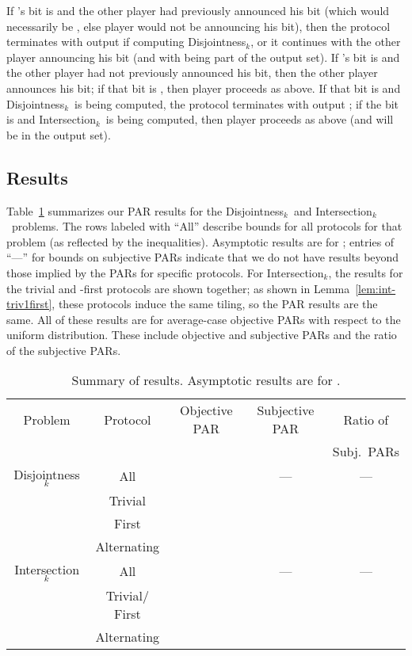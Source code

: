 \documentclass{article}
\theoremstyle{theorem}
\theoremstyle{definition}
\theoremstyle{remark}
\newcommand{\disjoint}{{\sc Dis\-joint\-ness}\ensuremath{_k}}
\newcommand{\intersection}{{\sc In\-ter\-sec\-tion}\ensuremath{_k}}
\begin{document}
If 's  bit is  and the other player had previously announced his  bit (which would necessarily be , else player  would not be announcing his  bit), then the protocol terminates with output  if computing \disjoint, or it continues with the other player announcing his  bit (and with  being part of the output set).  If 's  bit is  and the other player had not previously announced his  bit, then the other player announces his  bit; if that bit is , then player  proceeds as above.  If that bit is  and \disjoint\ is being computed, the protocol terminates with output ; if the bit is  and \intersection\ is being computed, then player  proceeds as above (and  will be in the output set).

\subsection{Results}

Table~\ref{tab:results} summarizes our PAR results for the \disjoint\ and \intersection\ problems.  The rows labeled with ``All'' describe bounds for all protocols for that problem (as reflected by the inequalities).  Asymptotic results are for ; entries of ``---'' for bounds on subjective PARs indicate that we do not have results beyond those implied by the PARs for specific protocols.
For \intersection, the results for the trivial and -first protocols are shown together; as shown in Lemma~\ref{lem:int-triv1first}, these protocols induce the same tiling, so the PAR results are the same.  All of these results are for average-case objective PARs with respect to the uniform distribution.  These include objective and subjective PARs and the ratio of the subjective PARs.



\begin{table}[htp]
\begin{center}
\small
\begin{tabular}{|c|c|c|c|c|}
  \hline
  Problem & Protocol & Objective PAR & Subjective PAR & Ratio of \\
          &          &               &                & Subj.\ PARs \\ \hline\hline
  \disjoint & All &  & --- & --- \\ \hline
    & Trivial &  &  &  \\ \hline
    &  First &  &  &  \\ \hline
    & Alternating &  &  &  \\ \hline \hline
  \intersection & All &  & --- & --- \\ \hline
    & Trivial/ First &    &  &  \\ \hline
    & Alternating &  &  &  \\ \hline
\end{tabular}
\end{center}
\caption{Summary of results.  Asymptotic results are for .}\label{tab:results}
\end{table}
\end{document}
